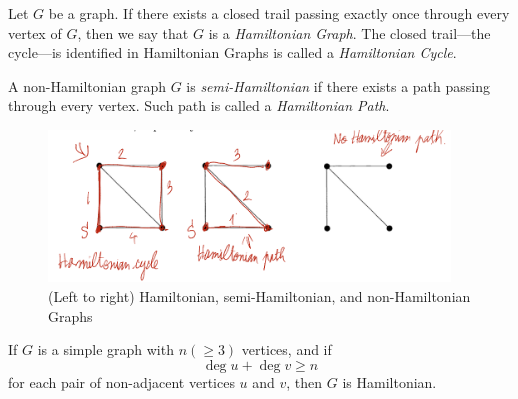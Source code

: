 \begin{definition}
  Let \(G\) be a graph. If there exists a closed trail passing exactly once
  through every vertex of \(G\), then we say that \(G\) is a \textit{Hamiltonian
  Graph}. The closed trail---the cycle---is identified in Hamiltonian Graphs is
  called a \textit{Hamiltonian Cycle}.
\end{definition}

\begin{definition}
  A non-Hamiltonian graph \(G\) is \textit{semi-Hamiltonian} if there exists a
  path passing through every vertex. Such path is called a \textit{Hamiltonian
  Path}.
\end{definition}

\begin{figure}[ht]
  \begin{center}
    \includegraphics[width=0.95\textwidth]{figures/l03/hamiltonian-graphs}
  \end{center}
  \caption{(Left to right) Hamiltonian, semi-Hamiltonian, and non-Hamiltonian
  Graphs}\label{fig:hamiltonian-graphs-examples}
\end{figure}

\begin{theorem}
  If \(G\) is a simple graph with \(n (\geq 3)\) vertices, and if 
  \[ \deg u + \deg v \geq n \]
  for each pair of non-adjacent vertices \(u\) and \(v\), then \(G\) is
  Hamiltonian.
\end{theorem}

